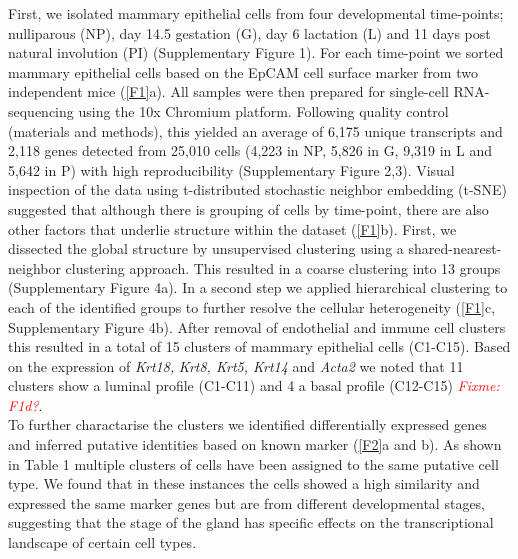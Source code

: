 \documentclass[titlepage, 12pt, oneside]{amsart}
\newcommand{\fixme}[1]{\textit{\textcolor{red}{Fixme: #1}}}
\begin{document}
First, we isolated mammary epithelial cells from four developmental time-points; nulliparous (NP), day 14.5 gestation (G), day 6 lactation (L) and 11 days post natural involution (PI) (Supplementary Figure 1).
For each time-point we sorted mammary epithelial cells based on the EpCAM cell surface marker from two independent mice (\autoref{F1}a).
All samples were then prepared for single-cell RNA-sequencing using the 10x Chromium platform\autocite{Zheng2017}.
Following quality control (materials and methods), this yielded an average of 6,175 unique transcripts and 2,118 genes detected from 25,010 cells (4,223 in NP, 5,826 in G, 9,319 in L and 5,642 in P) with high reproducibility (Supplementary Figure 2,3).
Visual inspection of the data using t-distributed stochastic neighbor embedding (t-SNE) suggested that although there is grouping of cells by time-point, there are also other factors that underlie structure within the dataset (\autoref{F1}b).
First, we dissected the global structure by unsupervised clustering using a shared-nearest-neighbor clustering approach.
This resulted in a coarse clustering into 13 groups (Supplementary Figure 4a).
In a second step we applied hierarchical clustering to each of the identified groups to further resolve the cellular heterogeneity (\autoref{F1}c, Supplementary Figure 4b).
After removal of endothelial and immune cell clusters this resulted in a total of 15 clusters of mammary epithelial cells (C1-C15).
Based on the expression of \textit{Krt18,} \textit{Krt8, Krt5, Krt14} and \textit{Acta2} we noted that 11 clusters show a luminal profile (C1-C11) and 4 a basal profile (C12-C15) \fixme{F1d?}.\\
To further charactarise the clusters we identified differentially expressed genes and inferred putative identities based on known marker (\autoref{F2}a and b).
As shown in Table 1 multiple clusters of cells have been assigned to the same putative cell type. We found that in these instances the cells showed a high similarity and expressed the same marker genes but are from different developmental stages, suggesting that the stage of the gland has specific effects on the transcriptional landscape of certain cell types.\\
\end{document}
